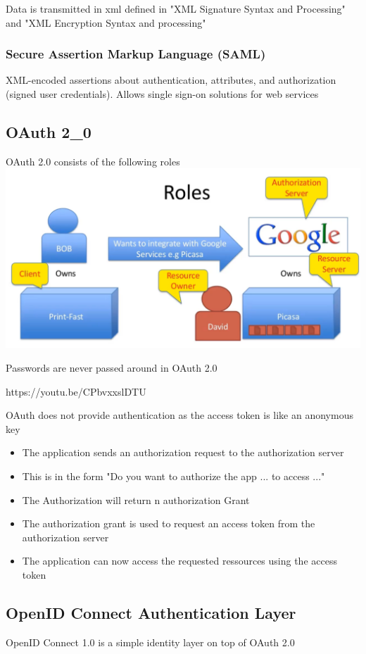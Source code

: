 \documentclass[12pt]{article}
\begin{document}
Data is transmitted in xml defined in "XML Signature Syntax and Processing" and "XML Encryption Syntax and processing"

\subsubsection*{Secure Assertion Markup Language (SAML)}
XML-encoded assertions about authentication, attributes, and authorization (signed user credentials). Allows single sign-on solutions for web services

\subsection*{OAuth 2_0}
OAuth 2.0 consists of the following roles
\includegraphics[width=\textwidth]{OAuth20Roles.png}

Passwords are never passed around in OAuth 2.0

https://youtu.be/CPbvxxslDTU

OAuth does not provide authentication as the access token is like an anonymous key

\begin{itemize}
    \item The application sends an authorization request to the authorization server
    \item This is in the form "Do you want to authorize the app ... to access ..."
    \item The Authorization will return n authorization Grant
    \item The authorization grant is used to request an access token from the authorization server
    \item The application can now access the requested ressources using the access token
\end{itemize}

\subsection*{OpenID Connect Authentication Layer}
OpenID Connect 1.0 is a simple identity layer on top of OAuth 2.0
\end{document}

